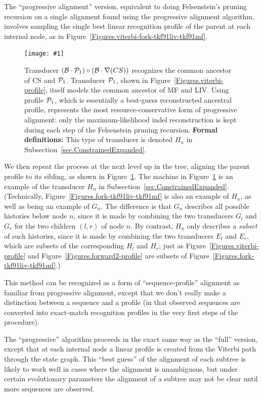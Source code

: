 \documentclass{article}
\newcommand{\secref}[1]{Subsection~\ref{sec.#1}}
\newcommand{\figref}[1]{Figure~\ref{Figures.#1}}
\newcommand{\figlabel}[1]{\label{Figures.#1}}
\newcommand{\easyfig}[4]{
\begin{figure}
\texttt{[image: \#1]}
\caption{ \figlabel{#3} #4}
\end{figure}}
\newcommand{\widepdffig}[2]{\easyfig{#1-fig.pdf}{width=\textwidth}{#1}{#2}}
\newcommand\tkf{{\cal B}}
\newcommand\profile{{\cal P}}
\newcommand\formaldefs{{\bf Formal definitions: }}
\newcommand\fork{\circ}
\newcommand\recognize{\nabla}
\begin{document}
The ``progressive alignment'' version,
equivalent to doing Felsenstein's pruning recursion on a single alignment
found using the progressive alignment algorithm,
involves sampling the single best linear recognition profile of the parent
 at each internal node, 
as in \figref{viterbi-fork-tkf91liv-tkf91mf}.  

\widepdffig{fork-tkf91viterbi-tkf91cs}{Transducer $(\tkf \cdot \profile_1)\fork(\tkf \cdot \recognize(CS))$ recognizes the common ancestor of CS and $\profile_1$.
Transducer $\profile_1$, shown in \figref{viterbi-profile}, itself models the common ancestor of MF and LIV.
Using profile $\profile_1$, which is essentially a best-guess reconstructed ancestral profile, represents the most resource-conservative form of progressive alignment: only the 
maximum-likelihood indel reconstruction is kept during each step of the Felsenstein pruning recursion.
\formaldefs
This type of transducer is denoted $H_n$ in \secref{ConstrainedExpanded}.
}

We then repeat the process at the next level up in the tree, aligning the parent profile to its sibling,
as shown in \figref{fork-tkf91viterbi-tkf91cs}.
The machine in \figref{fork-tkf91viterbi-tkf91cs} is an example of the transducer $H_n$
in \secref{ConstrainedExpanded}.
(Technically, \figref{fork-tkf91liv-tkf91mf} is also an example of $H_n$, as well as being an example of $G_n$.
The difference is that $G_n$ describes all possible histories below node $n$,
since it is made by combining the two transducers $G_l$ and $G_r$ for the two children $(l,r)$ of node $n$.
By contrast, $H_n$ only describes a {\em subset} of such histories,
since it is made by combining the two transducers $E_l$ and $E_r$,
which are subsets of the corresponding $H_l$ and $H_r$;
just as \figref{viterbi-profile} and \figref{forward2-profile} are subsets of
\figref{fork-tkf91liv-tkf91mf}.)

This method can be recognized as a form of ``sequence-profile''
 alignment as familiar from progressive alignment,
except that we don't really make a distinction between a sequence and a profile
(in that observed sequences are converted into exact-match recognition
 profiles in the very first steps of the procedure).

The ``progressive'' algorithm proceeds in the exact same way as the ``full'' version, 
except that at each internal node a linear profile is created from the Viterbi
path through the state graph.  This ``best guess'' of the alignment of each subtree
is likely to work well in cases where the alignment is unambiguous, but under
certain evolutionary parameters the alignment of a subtree may not be clear
until more sequences are observed. 
\end{document}
